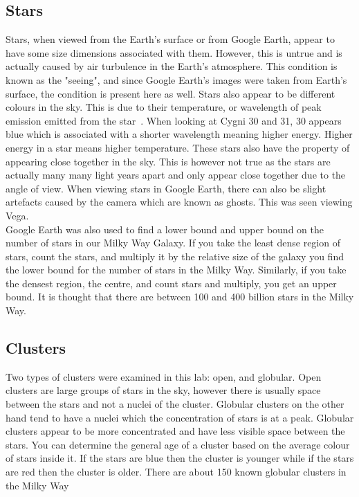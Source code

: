 \documentclass{article}
\begin{document}
\subsection{Stars}
Stars, when viewed from the Earth's surface or from Google Earth, appear to have some size
dimensions associated with them. However, this is untrue and is actually caused by air turbulence
in the Earth's atmosphere. This condition is known as the "seeing", and since Google Earth's
images were taken from Earth's surface, the condition is present here as well. Stars also appear
to be different colours in the sky. This is due to their temperature, or wavelength of peak emission
emitted from the star~\cite{Walker:2008}. 
When looking at Cygni 30 and 31, 30 appears blue which is associated with
a shorter wavelength meaning higher energy. Higher energy in a star means higher temperature.
These stars also have the property of appearing close together in the sky. This is however not
true as the stars are actually many many light years apart and only appear close together due to
the angle of view. When viewing stars in Google Earth, there can also be slight artefacts
caused by the camera which are known as ghosts. This was seen viewing Vega.\\

Google Earth was also used to find a lower bound and upper bound on the number of stars in
our Milky Way Galaxy. If you take the least dense region of stars, count the stars, and multiply it by the 
relative size of the galaxy you find the lower bound for the number of stars in the Milky Way.
Similarly, if you take the densest region, the centre, and count stars and multiply, you
get an upper bound. It is thought that there are between 100 and 400 billion stars in the Milky
Way.

\subsection{Clusters}
Two types of clusters were examined in this lab: open, and globular. Open clusters are large
groups of stars in the sky, however there is usually space between the stars and not a 
nuclei of the cluster. Globular clusters on the other hand tend to have a nuclei which 
the concentration of stars is at a peak. Globular clusters appear to be more concentrated
and have less visible space between the stars. You can determine the general age of a cluster
based on the average colour of stars inside it. If the stars are blue then the cluster is
younger while if the stars are red then the cluster is older. There are about 150 known
globular clusters in the Milky Way~\cite{Harris:2003}
\end{document}
